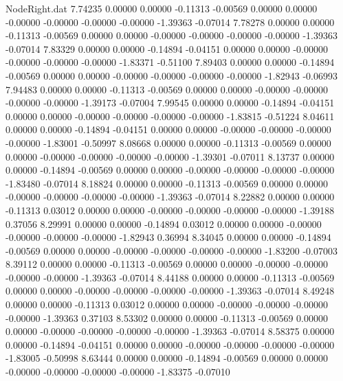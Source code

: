 \begin{filecontents}{NodeRight.dat}
   7.74235    0.00000    0.00000    -0.11313   -0.00569    0.00000    0.00000   -0.00000   -0.00000   -0.00000   -0.00000   -1.39363   -0.07014
   7.78278    0.00000    0.00000    -0.11313   -0.00569    0.00000    0.00000   -0.00000   -0.00000   -0.00000   -0.00000   -1.39363   -0.07014
   7.83329    0.00000    0.00000    -0.14894   -0.04151    0.00000    0.00000   -0.00000   -0.00000   -0.00000   -0.00000   -1.83371   -0.51100
   7.89403    0.00000    0.00000    -0.14894   -0.00569    0.00000    0.00000   -0.00000   -0.00000   -0.00000   -0.00000   -1.82943   -0.06993
   7.94483    0.00000    0.00000    -0.11313   -0.00569    0.00000    0.00000   -0.00000   -0.00000   -0.00000   -0.00000   -1.39173   -0.07004
   7.99545    0.00000    0.00000    -0.14894   -0.04151    0.00000    0.00000   -0.00000   -0.00000   -0.00000   -0.00000   -1.83815   -0.51224
   8.04611    0.00000    0.00000    -0.14894   -0.04151    0.00000    0.00000   -0.00000   -0.00000   -0.00000   -0.00000   -1.83001   -0.50997
   8.08668    0.00000    0.00000    -0.11313   -0.00569    0.00000    0.00000   -0.00000   -0.00000   -0.00000   -0.00000   -1.39301   -0.07011
   8.13737    0.00000    0.00000    -0.14894   -0.00569    0.00000    0.00000   -0.00000   -0.00000   -0.00000   -0.00000   -1.83480   -0.07014
   8.18824    0.00000    0.00000    -0.11313   -0.00569    0.00000    0.00000   -0.00000   -0.00000   -0.00000   -0.00000   -1.39363   -0.07014
   8.22882    0.00000    0.00000    -0.11313    0.03012    0.00000    0.00000   -0.00000   -0.00000   -0.00000   -0.00000   -1.39188    0.37056
   8.29991    0.00000    0.00000    -0.14894    0.03012    0.00000    0.00000   -0.00000   -0.00000   -0.00000   -0.00000   -1.82943    0.36994
   8.34045    0.00000    0.00000    -0.14894   -0.00569    0.00000    0.00000   -0.00000   -0.00000   -0.00000   -0.00000   -1.83200   -0.07003
   8.39112    0.00000    0.00000    -0.11313   -0.00569    0.00000    0.00000   -0.00000   -0.00000   -0.00000   -0.00000   -1.39363   -0.07014
   8.44188    0.00000    0.00000    -0.11313   -0.00569    0.00000    0.00000   -0.00000   -0.00000   -0.00000   -0.00000   -1.39363   -0.07014
   8.49248    0.00000    0.00000    -0.11313    0.03012    0.00000    0.00000   -0.00000   -0.00000   -0.00000   -0.00000   -1.39363    0.37103
   8.53302    0.00000    0.00000    -0.11313   -0.00569    0.00000    0.00000   -0.00000   -0.00000   -0.00000   -0.00000   -1.39363   -0.07014
   8.58375    0.00000    0.00000    -0.14894   -0.04151    0.00000    0.00000   -0.00000   -0.00000   -0.00000   -0.00000   -1.83005   -0.50998
   8.63444    0.00000    0.00000    -0.14894   -0.00569    0.00000    0.00000   -0.00000   -0.00000   -0.00000   -0.00000   -1.83375   -0.07010

\end{filecontents}
